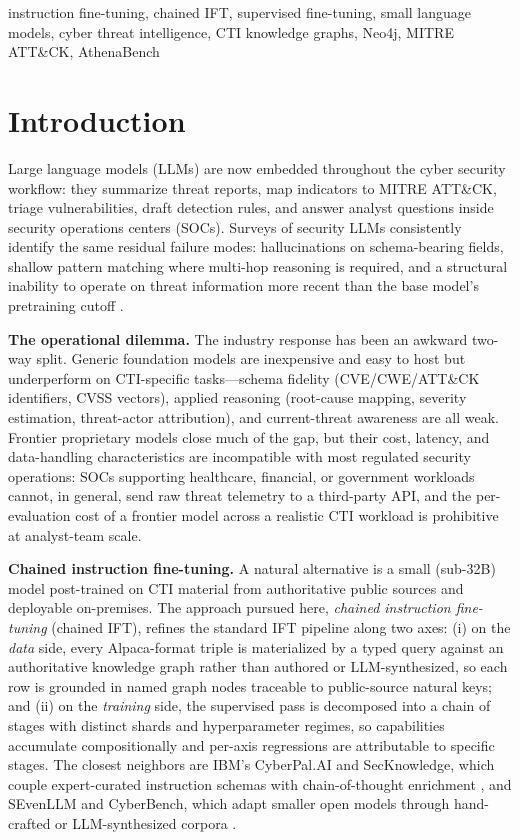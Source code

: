 \documentclass[conference]{IEEEtran}
\begin{document}
\begin{IEEEkeywords}
instruction fine-tuning, chained IFT, supervised fine-tuning, small language models, cyber threat intelligence, CTI knowledge graphs, Neo4j, MITRE ATT\&CK, AthenaBench
\end{IEEEkeywords}

\section{Introduction}

Large language models (LLMs) are now embedded throughout the cyber security workflow: they summarize threat reports, map indicators to MITRE ATT\&CK, triage vulnerabilities, draft detection rules, and answer analyst questions inside security operations centers (SOCs). Surveys of security LLMs consistently identify the same residual failure modes: hallucinations on schema-bearing fields, shallow pattern matching where multi-hop reasoning is required, and a structural inability to operate on threat information more recent than the base model's pretraining cutoff \cite{levi2024cyberpal,liu2024cyberbench}.

\textbf{The operational dilemma.} The industry response has been an awkward two-way split. Generic foundation models are inexpensive and easy to host but underperform on CTI-specific tasks---schema fidelity (CVE/CWE/ATT\&CK identifiers, CVSS vectors), applied reasoning (root-cause mapping, severity estimation, threat-actor attribution), and current-threat awareness are all weak. Frontier proprietary models close much of the gap, but their cost, latency, and data-handling characteristics are incompatible with most regulated security operations: SOCs supporting healthcare, financial, or government workloads cannot, in general, send raw threat telemetry to a third-party API, and the per-evaluation cost of a frontier model across a realistic CTI workload is prohibitive at analyst-team scale.

\textbf{Chained instruction fine-tuning.} A natural alternative is a small (sub-32B) model post-trained on CTI material from authoritative public sources and deployable on-premises. The approach pursued here, \textit{chained instruction fine-tuning} (chained IFT), refines the standard IFT pipeline \cite{wei2022flan,ouyang2022instructgpt,chung2022flant5} along two axes: (i) on the \emph{data} side, every Alpaca-format triple is materialized by a typed query against an authoritative knowledge graph rather than authored or LLM-synthesized, so each row is grounded in named graph nodes traceable to public-source natural keys; and (ii) on the \emph{training} side, the supervised pass is decomposed into a chain of stages with distinct shards and hyperparameter regimes, so capabilities accumulate compositionally and per-axis regressions are attributable to specific stages. The closest neighbors are IBM's CyberPal.AI and SecKnowledge, which couple expert-curated instruction schemas with chain-of-thought enrichment \cite{levi2024cyberpal,levi2025toward}, and SEvenLLM and CyberBench, which adapt smaller open models through hand-crafted or LLM-synthesized corpora \cite{ji2024sevenllm,liu2024cyberbench}.
\end{document}
